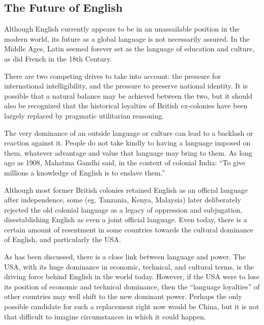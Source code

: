 \documentclass[../main.tex]{subfiles}
\begin{document}
        \subsection{The Future of English}
        Although English currently appears to be in an unassailable position in the modern world, its future as a global language is not necessarily assured. In the Middle Ages, Latin seemed forever set as the language of education and culture, as did French in the 18th Century. \par 
        There are two competing drives to take into account: the pressure for international intelligibility, and the pressure to preserve national identity. It is possible that a natural balance may be achieved between the two, but it should also be recognized that the historical loyalties of British ex-colonies have been largely replaced by pragmatic utilitarian reasoning. \par 
        The very dominance of an outside language or culture can lead to a backlash or reaction against it. People do not take kindly to having a language imposed on them, whatever advantage and value that language may bring to them. As long ago as 1908, Mahatma Gandhi said, in the context of colonial India: ``To give millions a knowledge of English is to enslave them.'' \par
        Although most former British colonies retained English as an official language after independence, some (eg. Tanzania, Kenya, Malaysia) later deliberately rejected the old colonial language as a legacy of oppression and subjugation, disestablishing English as even a joint official language. Even today, there is a certain amount of resentment in some countries towards the cultural dominance of English, and particularly the USA. \par 
        As has been discussed, there is a close link between language and power. The USA, with its huge dominance in economic, technical, and cultural terms, is the driving force behind English in the world today. However, if the USA were to lose its position of economic and technical dominance, then the ``language loyalties'' of other countries may well shift to the new dominant power. Perhaps the only possible candidate for such a replacement right now would be China, but it is not that difficult to imagine circumstances in which it could happen. \par 
\end{document}
